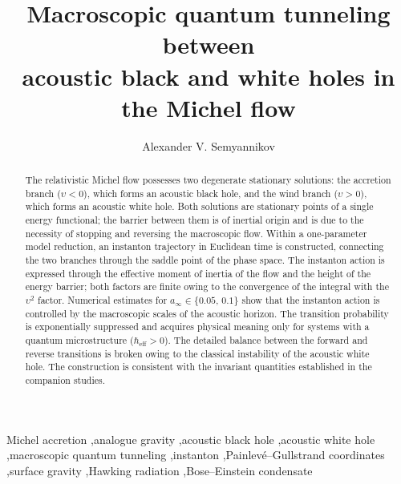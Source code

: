 \documentclass[12pt,a4paper,preprint]{elsarticle}
\begin{document}
    \begin{frontmatter}
        \title{Macroscopic quantum tunneling between\\acoustic black and white holes in the Michel flow}
        \author{Alexander V. Semyannikov}
        \address{Independent Researcher \\ \textit{Email: avsemyannikov@gmail.com}}
        
        \begin{abstract}
            The relativistic Michel flow possesses two degenerate stationary solutions: the accretion branch ($\upsilon < 0$), which forms an acoustic black hole, and the wind branch ($\upsilon > 0$), which forms an acoustic white hole. Both solutions are stationary points of a single energy functional; the barrier between them is of inertial origin and is due to the necessity of stopping and reversing the macroscopic flow. Within a one-parameter model reduction, an instanton trajectory in Euclidean time is constructed, connecting the two branches through the saddle point of the phase space. The instanton action is expressed through the effective moment of inertia of the flow and the height of the energy barrier; both factors are finite owing to the convergence of the integral with the $\upsilon^{2}$ factor. Numerical estimates for $a_{\infty} \in \{0.05,\, 0.1\}$ show that the instanton action is controlled by the macroscopic scales of the acoustic horizon. The transition probability is exponentially suppressed and acquires physical meaning only for systems with a quantum microstructure ($\hbar_{\mathrm{eff}} > 0$). The detailed balance between the forward and reverse transitions is broken owing to the classical instability of the acoustic white hole. The construction is consistent with the invariant quantities established in the companion studies.
        \end{abstract}
        
        \begin{keyword}
            Michel accretion \sep analogue gravity \sep acoustic black hole \sep acoustic white hole \sep macroscopic quantum tunneling \sep instanton \sep Painlev\'e--Gullstrand coordinates \sep surface gravity \sep Hawking radiation \sep Bose--Einstein condensate
        \end{keyword}
    \end{frontmatter}
\end{document}
